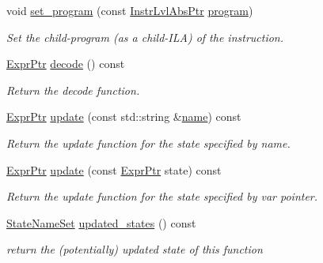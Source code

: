 \begin{DoxyCompactItemize}
void \mbox{\hyperlink{classilang_1_1_instr_a6e8812443ce74fef48c07af956d74bac}{set\+\_\+program}} (const \mbox{\hyperlink{classilang_1_1_instr_ab36b0ed04e0c44e66867ed1d61009f12}{Instr\+Lvl\+Abs\+Ptr}} \mbox{\hyperlink{classilang_1_1_instr_abdf1d7ce43fe4de27d9edf87a005e3b8}{program}})
\begin{DoxyCompactList}\small\item\em Set the child-\/program (as a child-\/\+I\+LA) of the instruction. \end{DoxyCompactList}\item 
\mbox{\label{classilang_1_1_instr_a85ca826871a1ed004189ef24e994cfea}} 
\mbox{\hyperlink{namespaceilang_a7c4196c72e53ea4df4b7861af7bc3bce}{Expr\+Ptr}} \mbox{\hyperlink{classilang_1_1_instr_a85ca826871a1ed004189ef24e994cfea}{decode}} () const
\begin{DoxyCompactList}\small\item\em Return the decode function. \end{DoxyCompactList}\item 
\mbox{\hyperlink{namespaceilang_a7c4196c72e53ea4df4b7861af7bc3bce}{Expr\+Ptr}} \mbox{\hyperlink{classilang_1_1_instr_a8da933306450bb7807b57e48fc18f1c4}{update}} (const std\+::string \&\mbox{\hyperlink{classilang_1_1_object_acf20b072e69f572910d7d80c93af0b38}{name}}) const
\begin{DoxyCompactList}\small\item\em Return the update function for the state specified by name. \end{DoxyCompactList}\item 
\mbox{\hyperlink{namespaceilang_a7c4196c72e53ea4df4b7861af7bc3bce}{Expr\+Ptr}} \mbox{\hyperlink{classilang_1_1_instr_a116a685b7132702f898f0f7a6f728382}{update}} (const \mbox{\hyperlink{namespaceilang_a7c4196c72e53ea4df4b7861af7bc3bce}{Expr\+Ptr}} state) const
\begin{DoxyCompactList}\small\item\em Return the update function for the state specified by var pointer. \end{DoxyCompactList}\item 
\mbox{\label{classilang_1_1_instr_a46e75dd9f5e0e06d44d3f0b6cfcd0d73}} 
\mbox{\hyperlink{classilang_1_1_instr_aa9f7f07cfbd07809131085e6190f489a}{State\+Name\+Set}} \mbox{\hyperlink{classilang_1_1_instr_a46e75dd9f5e0e06d44d3f0b6cfcd0d73}{updated\+\_\+states}} () const
\begin{DoxyCompactList}\small\item\em return the (potentially) updated state of this function \end{DoxyCompactList}\item 

\end{DoxyCompactItemize}
